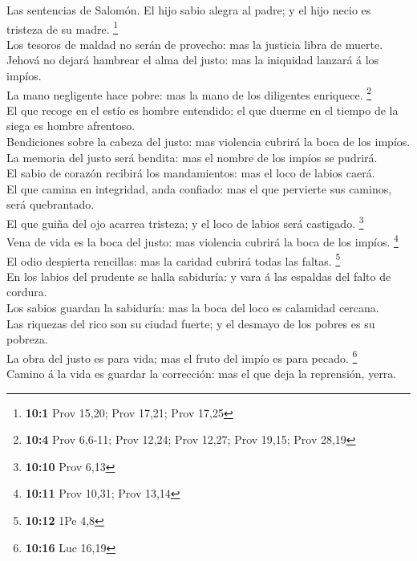  Las sentencias de Salomón. El hijo sabio alegra al padre; y
el hijo necio es tristeza de su madre. \footnote{\textbf{10:1} Prov
  15,20; Prov 17,21; Prov 17,25}\\
 Los tesoros de maldad no serán de provecho: mas la justicia
libra de muerte.\\
 Jehová no dejará hambrear el alma del justo: mas la
iniquidad lanzará á los impíos.\\
 La mano negligente hace pobre: mas la mano de los
diligentes enriquece. \footnote{\textbf{10:4} Prov 6,6-11; Prov 12,24;
  Prov 12,27; Prov 19,15; Prov 28,19}\\
 El que recoge en el estío es hombre entendido: el que
duerme en el tiempo de la siega es hombre afrentoso.\\
 Bendiciones sobre la cabeza del justo: mas violencia
cubrirá la boca de los impíos.\\
 La memoria del justo será bendita: mas el nombre de los
impíos se pudrirá.\\
 El sabio de corazón recibirá los mandamientos: mas el loco
de labios caerá.\\
 El que camina en integridad, anda confiado: mas el que
pervierte sus caminos, será quebrantado.\\
 El que guiña del ojo acarrea tristeza; y el loco de labios
será castigado. \footnote{\textbf{10:10} Prov 6,13}\\
 Vena de vida es la boca del justo: mas violencia cubrirá
la boca de los impíos. \footnote{\textbf{10:11} Prov 10,31; Prov 13,14}\\
 El odio despierta rencillas: mas la caridad cubrirá todas
las faltas. \footnote{\textbf{10:12} 1Pe 4,8}\\
 En los labios del prudente se halla sabiduría: y vara á
las espaldas del falto de cordura.\\
 Los sabios guardan la sabiduría: mas la boca del loco es
calamidad cercana.\\
 Las riquezas del rico son su ciudad fuerte; y el desmayo
de los pobres es su pobreza.\\
 La obra del justo es para vida; mas el fruto del impío es
para pecado. \footnote{\textbf{10:16} Luc 16,19}\\
 Camino á la vida es guardar la corrección: mas el que deja
la reprensión, yerra.\\
